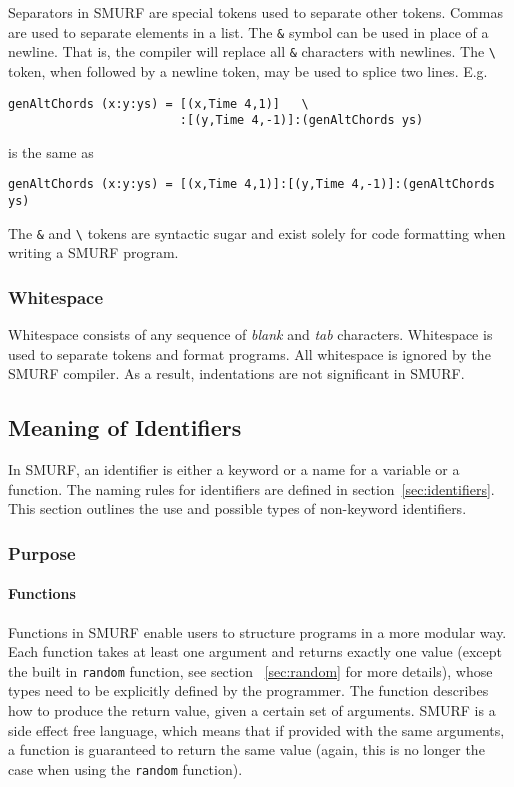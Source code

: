 Separators in SMURF are special tokens used to separate other tokens. 
Commas are used to separate elements in a list.
The \texttt{\&} symbol can be used in place of a newline. That is, the compiler
will replace all \texttt{\&} characters with newlines. The
\texttt{\textbackslash} token, when followed by a newline token,
may be used to splice two lines. E.g.
\begin{lstlisting}
genAltChords (x:y:ys) = [(x,Time 4,1)]   \
                        :[(y,Time 4,-1)]:(genAltChords ys)
\end{lstlisting}
is the same as 
\begin{lstlisting}
genAltChords (x:y:ys) = [(x,Time 4,1)]:[(y,Time 4,-1)]:(genAltChords ys)
\end{lstlisting}

The \texttt{\&} and \texttt{\textbackslash} tokens are syntactic sugar and exist solely for code formatting when writing a SMURF program.

\subsubsection{Whitespace}
\label{sec:whitespaces}
Whitespace consists of any sequence of {\it blank} and {\it tab} characters.
Whitespace is used to
separate tokens and format programs. All whitespace is ignored by the
SMURF compiler. As a result, indentations are not significant in SMURF.

\subsection{Meaning of Identifiers}
In SMURF, an identifier is either a keyword or a name for a variable or a function. 
The naming rules for identifiers are defined in section~\ref{sec:identifiers}. This section outlines
the use and possible types of non-keyword identifiers.


\subsubsection{Purpose}
\paragraph{Functions}
Functions in SMURF enable users to structure programs in a more modular way. 
Each function takes at least one argument and returns exactly one value (except the built in \texttt{random} function, see section
~\ref{sec:random} for more details), whose types need to be 
explicitly defined by the programmer. The function describes how to produce the return value,
given a certain set of arguments.
SMURF is a side effect free language, which means
that if provided with the same arguments, a function is guaranteed to return the same value (again, this is no longer the case
when using the \texttt{random} function). 



